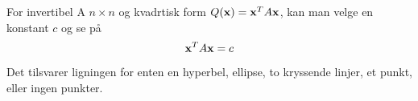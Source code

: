 For invertibel A $n\times n$ og kvadrtisk form $Q(\mathbf{x})=\mathbf{x}^TA\mathbf{x}$,
kan man velge en konstant $c$ og se på
$$\mathbf{x}^TA\mathbf{x} = c$$

Det tilsvarer ligningen for enten en hyperbel, ellipse, to kryssende linjer,
et punkt, eller ingen punkter.
